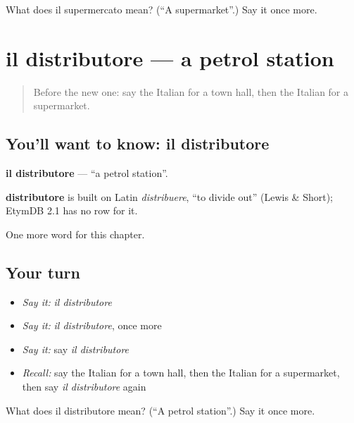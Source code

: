 \begin{tcolorbox}[breakable,colback=teal!4,colframe=teal!35!black,title={Before you move on}]
What does il supermercato mean? (\textquotedblleft{}A supermarket\textquotedblright{}.) Say it once more.
\end{tcolorbox}
\section[il distributore]{il distributore — a petrol station}

\label{lesson:IT-C88-distributore}



\begin{quote}
Before the new one: say the Italian for a town hall, then the Italian for a supermarket.
\end{quote}

\subsection*{You'll want to know: il distributore}
\textbf{il distributore} — \textquotedblleft{}a petrol station\textquotedblright{}.

\begin{cousinweb}
\textbf{distributore} is built on Latin \emph{distribuere}, \textquotedblleft{}to divide out\textquotedblright{} (Lewis \& Short); EtymDB 2.1 has no row for it.
\end{cousinweb}

\begin{grammarlens}[title={What you've built}]
One more word for this chapter.
\end{grammarlens}

\subsection*{Your turn}
\begin{itemize}
\raggedright
  \item \emph{Say it:} \emph{il distributore}
  \item \emph{Say it:} \emph{il distributore}, once more
  \item \emph{Say it:} say \emph{il distributore}
  \item \emph{Recall:} say the Italian for a town hall, then the Italian for a supermarket, then say \emph{il distributore} again
\end{itemize}

\begin{tcolorbox}[breakable,colback=teal!4,colframe=teal!35!black,title={Before you move on}]
What does il distributore mean? (\textquotedblleft{}A petrol station\textquotedblright{}.) Say it once more.
\end{tcolorbox}
